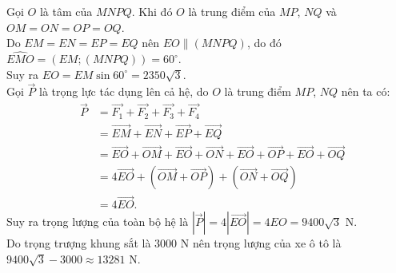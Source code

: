\begin{bt}
{{
		}
		Gọi $O$ là tâm của $MNPQ$. Khi đó $O$ là trung điểm của $MP$, $NQ$ và $OM = ON  = OP  = OQ$.\\
		Do $EM = EN = EP =EQ$ nên $EO \parallel (MNPQ)$, do đó $\widehat{EMO} = \left(EM;(MNPQ)\right) = 60^\circ$.\\
		Suy ra $EO = EM \sin 60^\circ = 2350\sqrt{3}$.\\
		Gọi $\overrightarrow{P}$ là trọng lực tác dụng lên cả hệ, do $O$ là trung điểm $MP$, $NQ$ nên ta có:
		\begin{eqnarray*}
			& \overrightarrow{P} & = \overrightarrow{F_1}+\overrightarrow{F_2}+\overrightarrow{F_3}+\overrightarrow{F_4}\\
			& & = \overrightarrow{EM } + \overrightarrow{EN} + \overrightarrow{EP} + \overrightarrow{EQ}\\
			& & = \overrightarrow{EO} + \overrightarrow{OM} + \overrightarrow{EO} + \overrightarrow{ON} + \overrightarrow{EO} + \overrightarrow{OP} + \overrightarrow{EO} + \overrightarrow{OQ}\\
			& & = 4\overrightarrow{EO} + \left(\overrightarrow{OM} + \overrightarrow{OP}\right) + \left(\overrightarrow{ON} + \overrightarrow{OQ}\right)\\
			& & = 4\overrightarrow{EO}. 
		\end{eqnarray*} 
		Suy ra trọng lượng của toàn bộ hệ là $\left| \overrightarrow{P} \right| = 4\left| \overrightarrow{EO}\right| = 4EO = 9400\sqrt{3}$ N.\\
		Do trọng trượng khung sắt là $3000$ N nên trọng lượng của xe ô tô là $9400\sqrt{3} - 3000 \approx 13281$ N.
	}
\end{bt}

